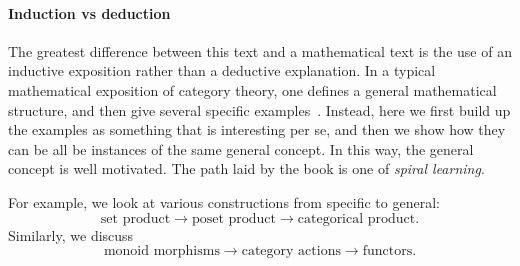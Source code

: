 \paragraph{Induction vs deduction}

The greatest difference between this text and a mathematical text is the use of an inductive exposition rather than a deductive explanation.
In a typical mathematical exposition of category theory, one defines a general mathematical structure, and then give several specific examples~\cite{riehl2017category}.
Instead, here we first build up the examples as something that is interesting per se, and then we show how they can be all be instances of the same general concept.
In this way, the general concept is well motivated.
The path laid by the book is one of \emph{spiral learning}.

For example, we look at various constructions from specific to general:
%
\begin{equation}
    \text{set product}  \to \text{poset product} \to \text{categorical product}.
\end{equation}
%
Similarly, we discuss
%
\begin{equation}
    \text{monoid morphisms}  \to \text{category actions} \to \text{functors}.
\end{equation}

